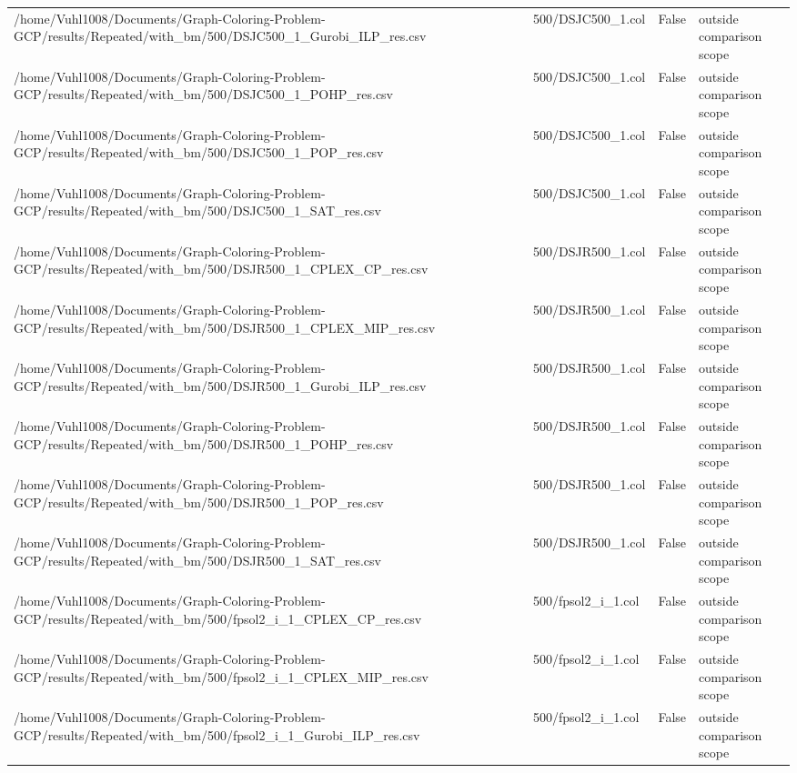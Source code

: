 \begin{table}[htbp]
\begin{tabular}{llll}
/home/Vuhl1008/Documents/Graph-Coloring-Problem-GCP/results/Repeated/with\_bm/500/DSJC500\_1\_Gurobi\_ILP\_res.csv & 500/DSJC500\_1.col & False & outside comparison scope \\
/home/Vuhl1008/Documents/Graph-Coloring-Problem-GCP/results/Repeated/with\_bm/500/DSJC500\_1\_POHP\_res.csv & 500/DSJC500\_1.col & False & outside comparison scope \\
/home/Vuhl1008/Documents/Graph-Coloring-Problem-GCP/results/Repeated/with\_bm/500/DSJC500\_1\_POP\_res.csv & 500/DSJC500\_1.col & False & outside comparison scope \\
/home/Vuhl1008/Documents/Graph-Coloring-Problem-GCP/results/Repeated/with\_bm/500/DSJC500\_1\_SAT\_res.csv & 500/DSJC500\_1.col & False & outside comparison scope \\
/home/Vuhl1008/Documents/Graph-Coloring-Problem-GCP/results/Repeated/with\_bm/500/DSJR500\_1\_CPLEX\_CP\_res.csv & 500/DSJR500\_1.col & False & outside comparison scope \\
/home/Vuhl1008/Documents/Graph-Coloring-Problem-GCP/results/Repeated/with\_bm/500/DSJR500\_1\_CPLEX\_MIP\_res.csv & 500/DSJR500\_1.col & False & outside comparison scope \\
/home/Vuhl1008/Documents/Graph-Coloring-Problem-GCP/results/Repeated/with\_bm/500/DSJR500\_1\_Gurobi\_ILP\_res.csv & 500/DSJR500\_1.col & False & outside comparison scope \\
/home/Vuhl1008/Documents/Graph-Coloring-Problem-GCP/results/Repeated/with\_bm/500/DSJR500\_1\_POHP\_res.csv & 500/DSJR500\_1.col & False & outside comparison scope \\
/home/Vuhl1008/Documents/Graph-Coloring-Problem-GCP/results/Repeated/with\_bm/500/DSJR500\_1\_POP\_res.csv & 500/DSJR500\_1.col & False & outside comparison scope \\
/home/Vuhl1008/Documents/Graph-Coloring-Problem-GCP/results/Repeated/with\_bm/500/DSJR500\_1\_SAT\_res.csv & 500/DSJR500\_1.col & False & outside comparison scope \\
/home/Vuhl1008/Documents/Graph-Coloring-Problem-GCP/results/Repeated/with\_bm/500/fpsol2\_i\_1\_CPLEX\_CP\_res.csv & 500/fpsol2\_i\_1.col & False & outside comparison scope \\
/home/Vuhl1008/Documents/Graph-Coloring-Problem-GCP/results/Repeated/with\_bm/500/fpsol2\_i\_1\_CPLEX\_MIP\_res.csv & 500/fpsol2\_i\_1.col & False & outside comparison scope \\
/home/Vuhl1008/Documents/Graph-Coloring-Problem-GCP/results/Repeated/with\_bm/500/fpsol2\_i\_1\_Gurobi\_ILP\_res.csv & 500/fpsol2\_i\_1.col & False & outside comparison scope \\

\end{tabular}
\end{table}
